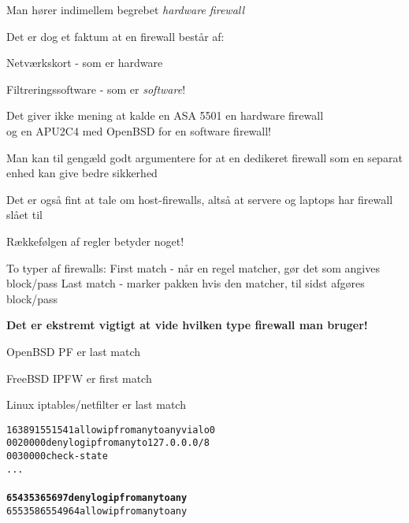 \documentclass[Screen16to9,17pt]{foils}
\begin{document}
\begin{list1}
\item Man hører indimellem begrebet \emph{hardware firewall}
\item Det er dog et faktum at en firewall består af:
\begin{list2}
\item Netværkskort - som er hardware
\item Filtreringssoftware - som er \emph{software}!
\end{list2}
\item Det giver ikke mening at kalde en ASA 5501 en hardware firewall\\
  og en APU2C4 med OpenBSD for en software firewall!
\item Man kan til gengæld godt argumentere for at en dedikeret
  firewall som en separat enhed kan give bedre sikkerhed
  \item Det er også fint at tale om host-firewalls, altså at servere og laptops har firewall slået til
\end{list1}








\begin{list1}
\item Rækkefølgen af regler betyder noget!
\begin{list2}
\item To typer af firewalls:
 First match - når en regel matcher, gør det som angives block/pass
 Last match  - marker pakken hvis den matcher, til sidst afgøres block/pass
\end{list2}
\item {\bf Det er ekstremt vigtigt at vide hvilken type firewall
    man bruger!}
\item OpenBSD PF er last match
\item FreeBSD IPFW er first match
\item Linux iptables/netfilter er last match
\end{list1}






\begin{alltt}
 16389  1551541 allow ip from any to any via lo0
00200     0        0 deny log ip from any to 127.0.0.0/8
00300     0        0 check-state
...
{\bfseries
65435    36     5697 deny log ip from any to any}
65535   865    54964 allow ip from any to any
\end{alltt}
\end{document}
